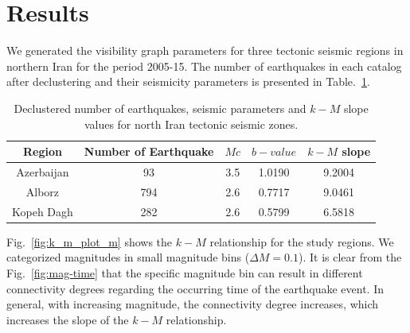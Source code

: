 \section{Results}
\noindent
We generated the visibility graph parameters for three tectonic seismic regions in northern Iran for the period 2005-15. The number of earthquakes in each catalog after declustering and their seismicity parameters is presented in Table.~\ref{tab:b_k_m_param}. 

\begin{table}[h]
\centering
\caption{Declustered number of earthquakes, seismic parameters and $k-M$ slope values for north Iran tectonic seismic zones.}
\begin{tabular}{ccccc}
Region          & Number of Earthquake &  $Mc$ &  $b-value$ & $k-M$ slope \\ \hline
Azerbaijan     & 93                                 & 3.5   & 1.0190  & 9.2004       \\ \hline
Alborz            & 794                               & 2.6   & 0.7717  & 9.0461      \\ \hline
Kopeh Dagh  & 282                               & 2.6   & 0.5799  & 6.5818     \\ \hline
\end{tabular}
\label{tab:b_k_m_param}
\end{table}

\noindent
Fig.~\ref{fig:k_m_plot_m}  shows the  $k-M$  relationship for the study regions. We categorized magnitudes in small magnitude bins ($\Delta M=0.1$). It is clear from the Fig.~\ref{fig:mag-time} that the specific magnitude bin can result in different connectivity degrees regarding the occurring time of the earthquake event. In general, with increasing magnitude, the connectivity degree increases, which increases the slope of the  $k-M$  relationship. 

